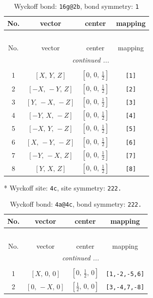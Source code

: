 \documentclass[fleqn,8pt]{jsarticle}
\begin{document}
\begin{longtable}{cccc}
\caption{Wyckoff bond: {\tt 16g@2b}, bond symmetry: {\tt 1}}
 \\
 \hline \hline
No. & vector & center & mapping \\ \hline \endfirsthead

\multicolumn{3}{l}{\tablename\ \thetable{}} \\
 \hline \hline
No. & vector & center & mapping \\ \hline \endhead

 \hline \hline
\multicolumn{3}{r}{\footnotesize\it continued ...} \\ \endfoot

 \hline \hline
\multicolumn{3}{r}{} \\ \endlastfoot

1 & $\left[ X,\, Y,\, Z \right]$ & $\left[ 0,\, 0,\, \frac{1}{2} \right]$ & {\tt [1]} \\ \hline
2 & $\left[ - X,\, - Y,\, Z \right]$ & $\left[ 0,\, 0,\, \frac{1}{2} \right]$ & {\tt [2]} \\ \hline
3 & $\left[ Y,\, - X,\, - Z \right]$ & $\left[ 0,\, 0,\, \frac{1}{2} \right]$ & {\tt [3]} \\ \hline
4 & $\left[ - Y,\, X,\, - Z \right]$ & $\left[ 0,\, 0,\, \frac{1}{2} \right]$ & {\tt [4]} \\ \hline
5 & $\left[ - X,\, Y,\, - Z \right]$ & $\left[ 0,\, 0,\, \frac{1}{2} \right]$ & {\tt [5]} \\ \hline
6 & $\left[ X,\, - Y,\, - Z \right]$ & $\left[ 0,\, 0,\, \frac{1}{2} \right]$ & {\tt [6]} \\ \hline
7 & $\left[ - Y,\, - X,\, Z \right]$ & $\left[ 0,\, 0,\, \frac{1}{2} \right]$ & {\tt [7]} \\ \hline
8 & $\left[ Y,\, X,\, Z \right]$ & $\left[ 0,\, 0,\, \frac{1}{2} \right]$ & {\tt [8]} \\
\end{longtable}
* Wyckoff site: {\tt 4c}, site symmetry: {\tt 222.}
\renewcommand{\arraystretch}{1.2}
\begin{longtable}{cccc}
\caption{Wyckoff bond: {\tt 4a@4c}, bond symmetry: {\tt 222.}}
 \\
 \hline \hline
No. & vector & center & mapping \\ \hline \endfirsthead

\multicolumn{3}{l}{\tablename\ \thetable{}} \\
 \hline \hline
No. & vector & center & mapping \\ \hline \endhead

 \hline \hline
\multicolumn{3}{r}{\footnotesize\it continued ...} \\ \endfoot

 \hline \hline
\multicolumn{3}{r}{} \\ \endlastfoot

1 & $\left[ X,\, 0,\, 0 \right]$ & $\left[ 0,\, \frac{1}{2},\, 0 \right]$ & {\tt [1,-2,-5,6]} \\ \hline
2 & $\left[ 0,\, - X,\, 0 \right]$ & $\left[ \frac{1}{2},\, 0,\, 0 \right]$ & {\tt [3,-4,7,-8]} \\
\end{longtable}
\end{document}
